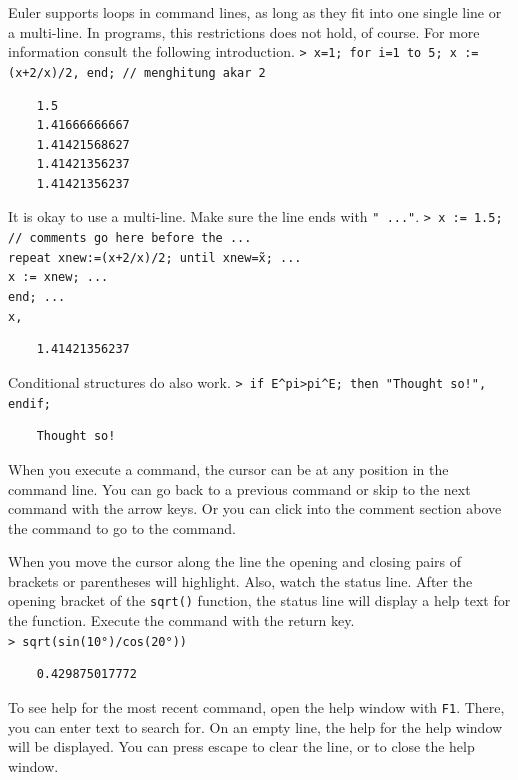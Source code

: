 \documentclass[11pt, a4paper]{article}
\newcommand{\emtcmd}[1]{\noindent\texttt{\textcolor{emtcommand}{>}\ #1}\par\smallskip}
\begin{document}
Euler supports loops in command lines, as long as they fit into one single line or a multi-line. In programs, this restrictions does not hold, of course. For more information consult the following introduction.
\emtcmd{x=1; for i=1 to 5; x := (x+2/x)/2, end; \textcolor{emtcomment}{// menghitung akar 2}}
\begin{verbatim}
    1.5
    1.41666666667
    1.41421568627
    1.41421356237
    1.41421356237
\end{verbatim}

It is okay to use a multi-line. Make sure the line ends with \texttt{" ..."}.
\emtcmd{x := 1.5; \textcolor{emtcomment}{// comments go here before the ...} \\
\hspace*{1em} repeat xnew:=(x+2/x)/2; until xnew\~=x; ... \\
\hspace*{2em} x := xnew; ... \\
\hspace*{1em} end; ... \\
\hspace*{1em} x,}
\begin{verbatim}
    1.41421356237
\end{verbatim}

Conditional structures do also work.
\emtcmd{if E\^{}pi>pi\^{}E; then "Thought so!", endif;}
\begin{verbatim}
    Thought so!
\end{verbatim}

When you execute a command, the cursor can be at any position in the command line. You can go back to a previous command or skip to the next command with the arrow keys. Or you can click into the comment section above the command to go to the command.

When you move the cursor along the line the opening and closing pairs of brackets or parentheses will highlight. Also, watch the status line. After the opening bracket of the \texttt{sqrt()} function, the status line will display a help text for the function. Execute the command with the return key.
\emtcmd{sqrt(sin(10°)/cos(20°))}
\begin{verbatim}
    0.429875017772
\end{verbatim}

To see help for the most recent command, open the help window with \texttt{F1}. There, you can enter text to search for. On an empty line, the help for the help window will be displayed. You can press escape to clear the line, or to close the help window.
\end{document}
